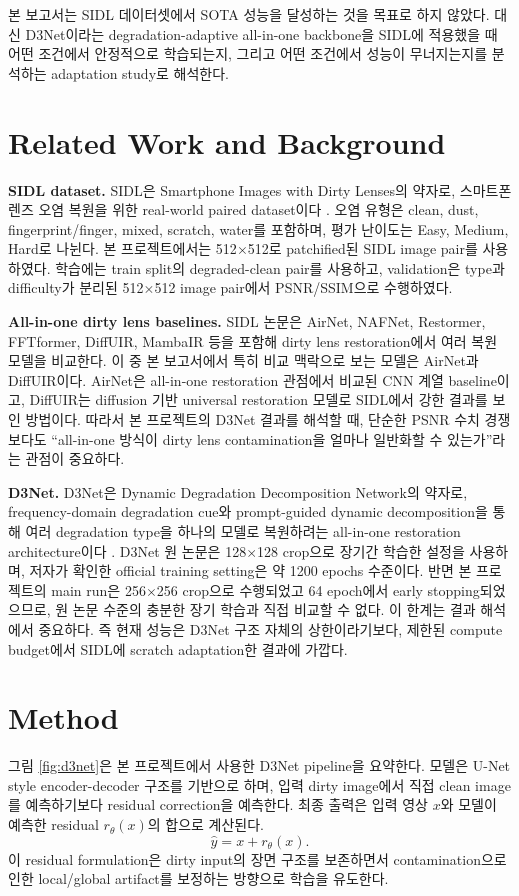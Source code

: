 \documentclass[10pt,a4paper]{article}
\begin{document}
본 보고서는 SIDL 데이터셋에서 SOTA 성능을 달성하는 것을 목표로 하지 않았다. 대신 D3Net이라는 degradation-adaptive all-in-one backbone을 SIDL에 적용했을 때 어떤 조건에서 안정적으로 학습되는지, 그리고 어떤 조건에서 성능이 무너지는지를 분석하는 adaptation study로 해석한다.

\section{Related Work and Background}
\textbf{SIDL dataset.}
SIDL은 Smartphone Images with Dirty Lenses의 약자로, 스마트폰 렌즈 오염 복원을 위한 real-world paired dataset이다 \cite{choi2025sidl}.
오염 유형은 clean, dust, fingerprint/finger, mixed, scratch, water를 포함하며, 평가 난이도는 Easy, Medium, Hard로 나뉜다.
본 프로젝트에서는 512$\times$512로 patchified된 SIDL image pair를 사용하였다.
학습에는 train split의 degraded-clean pair를 사용하고, validation은 type과 difficulty가 분리된 512$\times$512 image pair에서 PSNR/SSIM으로 수행하였다.

\textbf{All-in-one dirty lens baselines.}
SIDL 논문은 AirNet, NAFNet, Restormer, FFTformer, DiffUIR, MambaIR 등을 포함해 dirty lens restoration에서 여러 복원 모델을 비교한다.
이 중 본 보고서에서 특히 비교 맥락으로 보는 모델은 AirNet과 DiffUIR이다.
AirNet은 all-in-one restoration 관점에서 비교된 CNN 계열 baseline이고, DiffUIR는 diffusion 기반 universal restoration 모델로 SIDL에서 강한 결과를 보인 방법이다.
따라서 본 프로젝트의 D3Net 결과를 해석할 때, 단순한 PSNR 수치 경쟁보다도 ``all-in-one 방식이 dirty lens contamination을 얼마나 일반화할 수 있는가''라는 관점이 중요하다.

\textbf{D3Net.}
D3Net은 Dynamic Degradation Decomposition Network의 약자로, frequency-domain degradation cue와 prompt-guided dynamic decomposition을 통해 여러 degradation type을 하나의 모델로 복원하려는 all-in-one restoration architecture이다 \cite{wang2025d3net}.
D3Net 원 논문은 128$\times$128 crop으로 장기간 학습한 설정을 사용하며, 저자가 확인한 official training setting은 약 1200 epochs 수준이다.
반면 본 프로젝트의 main run은 256$\times$256 crop으로 수행되었고 64 epoch에서 early stopping되었으므로, 원 논문 수준의 충분한 장기 학습과 직접 비교할 수 없다.
이 한계는 결과 해석에서 중요하다. 즉 현재 성능은 D3Net 구조 자체의 상한이라기보다, 제한된 compute budget에서 SIDL에 scratch adaptation한 결과에 가깝다.

\section{Method}
그림 \ref{fig:d3net}은 본 프로젝트에서 사용한 D3Net pipeline을 요약한다.
모델은 U-Net style encoder-decoder 구조를 기반으로 하며, 입력 dirty image에서 직접 clean image를 예측하기보다 residual correction을 예측한다.
최종 출력은 입력 영상 $x$와 모델이 예측한 residual $r_\theta(x)$의 합으로 계산된다.
\begin{equation}
    \hat{y} = x + r_\theta(x).
\end{equation}
이 residual formulation은 dirty input의 장면 구조를 보존하면서 contamination으로 인한 local/global artifact를 보정하는 방향으로 학습을 유도한다.
\end{document}
